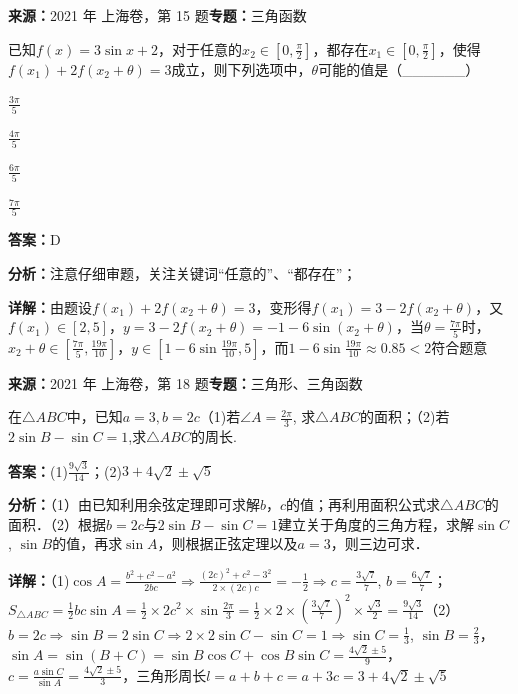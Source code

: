 \begin{question}[points=5]
\textbf{来源：}2021 年 上海卷，第 15 题\quad \textbf{专题：}三角函数\par
已知$f(x)=3\sin x+2$，对于任意的$x_2\in[0,\frac{\pi}{2}]$，都存在$x_1\in[0,\frac{\pi}{2}]$，使得$f(x_1)+2f(x_2+\theta)=3$成立，则下列选项中，$\theta$可能的值是（\_\_\_\_\_\_）
\begin{choices}
  \item $\frac{3\pi}{5}$
  \item $\frac{4\pi}{5}$
  \item $\frac{6\pi}{5}$
  \item $\frac{7\pi}{5}$
\end{choices}
\begin{solution}
\textbf{答案：}D

\textbf{分析：}注意仔细审题，关注关键词“任意的”、“都存在”；

\textbf{详解：}由题设$f(x_1)+2f(x_2+\theta)=3$，变形得$f(x_1)=3-2f(x_2+\theta)$，又$f(x_1)\in[2,5]$，$y=3-2f(x_2+\theta)=-1-6\sin(x_2+\theta)$，当$\theta=\frac{7\pi}{5}$时，$x_2+\theta\in[\frac{7\pi}{5},\frac{19\pi}{10}]$，$y\in[1-6\sin\frac{19\pi}{10},5]$，而$1-6\sin\frac{19\pi}{10}\approx0.85<2$符合题意
\end{solution}
\end{question}

\begin{question}[points=14]
\textbf{来源：}2021 年 上海卷，第 18 题\quad \textbf{专题：}三角形、三角函数\par
在$\triangle ABC$中，已知$a=3, b=2c$（1)若$\angle A=\frac{2\pi}{3}$, 求$\triangle ABC$的面积；（2)若$2\sin B-\sin C=1$,求$\triangle ABC$的周长.
\begin{solution}
\textbf{答案：}(1)$\frac{9\sqrt{3}}{14}$；(2)$3+4\sqrt{2}\pm\sqrt{5}$

\textbf{分析：}（1）由已知利用余弦定理即可求解$b$，$c$的值；再利用面积公式求$\triangle ABC$的面积．（2）根据$b=2c$与$2\sin B-\sin C=1$建立关于角度的三角方程，求解$\sin C$, $\sin B$的值，再求$\sin A$，则根据正弦定理以及$a=3$，则三边可求．

\textbf{详解：}（1)$\cos A=\frac{b^2+c^2-a^2}{2bc}\Rightarrow\frac{(2c)^2+c^2-3^2}{2\times(2c)c}=-\frac{1}{2}\Rightarrow c=\frac{3\sqrt{7}}{7}$, $b=\frac{6\sqrt{7}}{7}$；$S_{\triangle ABC}=\frac{1}{2}bc\sin A=\frac{1}{2}\times2c^2\times\sin\frac{2\pi}{3}=\frac{1}{2}\times2\times(\frac{3\sqrt{7}}{7})^2\times\frac{\sqrt{3}}{2}=\frac{9\sqrt{3}}{14}$（2）$b=2c\Rightarrow\sin B=2\sin C\Rightarrow2\times2\sin C-\sin C=1\Rightarrow\sin C=\frac{1}{3}$, $\sin B=\frac{2}{3}$，$\sin A=\sin(B+C)=\sin B\cos C+\cos B\sin C=\frac{4\sqrt{2}\pm5}{9}$，$c=\frac{a\sin C}{\sin A}=\frac{4\sqrt{2}\pm5}{3}$，三角形周长$l=a+b+c=a+3c=3+4\sqrt{2}\pm\sqrt{5}$
\end{solution}
\end{question}

